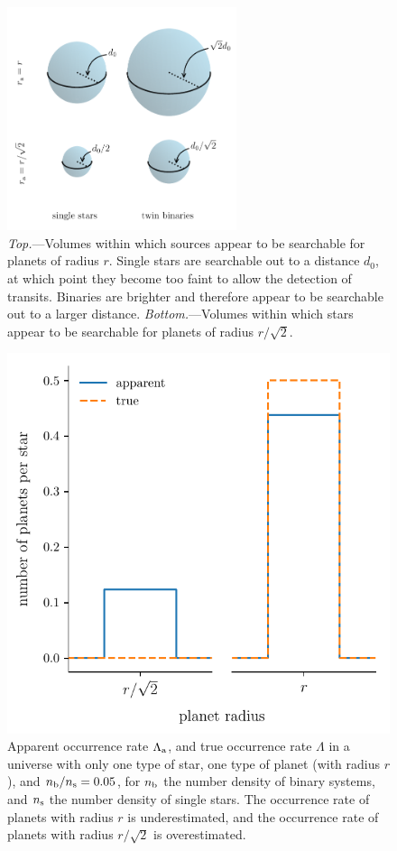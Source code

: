 \documentclass[12pt,modern,trackchanges]{aastex61}
\renewcommand{\a}{_{\rm a}}
\newcommand{\s}{_{\rm s}}
\renewcommand{\b}{_{\rm b}}
\begin{document}
\begin{figure}[!tb]
    \begin{center}
        \includegraphics[width=0.6\textwidth]{f1.pdf}
    \end{center}
    \caption{ {\it Top.}---Volumes within which sources appear to be
    searchable for planets of radius $r$.  Single stars are searchable
    out to a distance $d_0$, at which point they become too faint to
    allow the detection of transits.  Binaries are brighter and
    therefore appear to be searchable out to a larger distance.  {\it
    Bottom.}---Volumes within which stars appear to be searchable for
    planets of radius $r/\sqrt{2}$.  }
    \label{fig:model_1_volumes}
\end{figure}

\begin{figure}[!tb]
    \begin{center}
        \includegraphics[width=.6\textwidth]{f2.pdf}
    \end{center}
    \vspace{-0.5cm}
    \caption{ Apparent occurrence rate $\Lambda\a$, and true
    occurrence rate $\Lambda$ in a universe with only one type of
    star, one type of planet (with radius $r$), and $n\b/n\s=0.05$,
    for $n\b$ the number density of binary systems, and $n\s$ the
    number density of single stars.  The occurrence rate of planets
    with radius $r$ is underestimated, and the occurrence rate of
    planets with radius $r/\sqrt{2}$ is overestimated.}
    \label{fig:occ_rate_model_1}
\end{figure}
\end{document}
